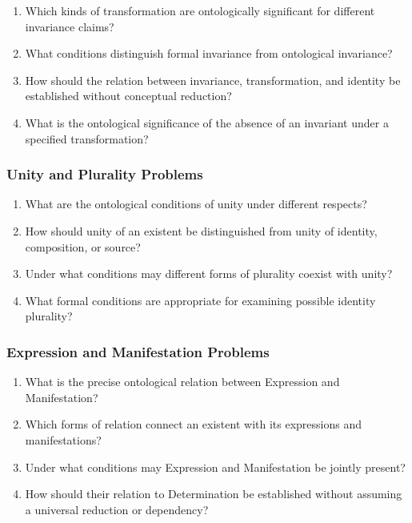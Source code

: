 \begin{enumerate}
    \item Which kinds
    of transformation
    are ontologically
    significant for
    different invariance
    claims?

    \item What conditions
    distinguish formal
    invariance from
    ontological invariance?

    \item How should
    the relation
    between invariance,
    transformation, and
    identity be
    established without
    conceptual reduction?

    \item What is
    the ontological
    significance of
    the absence
    of an
    invariant under
    a specified
    transformation?
\end{enumerate}

\subsubsection{Unity and Plurality Problems}

\begin{enumerate}
    \item What are
    the ontological
    conditions of
    unity under
    different respects?

    \item How should
    unity of
    an existent
    be distinguished
    from unity
    of identity,
    composition, or
    source?

    \item Under what
    conditions may
    different forms
    of plurality
    coexist with
    unity?

    \item What formal
    conditions are
    appropriate for
    examining possible
    identity plurality?
\end{enumerate}

\subsubsection{Expression and Manifestation Problems}

\begin{enumerate}
    \item What is
    the precise
    ontological relation
    between Expression
    and Manifestation?

    \item Which forms
    of relation
    connect an
    existent with
    its expressions
    and manifestations?

    \item Under what
    conditions may
    Expression and
    Manifestation be
    jointly present?

    \item How should
    their relation
    to Determination
    be established
    without assuming
    a universal
    reduction or
    dependency?
\end{enumerate}

